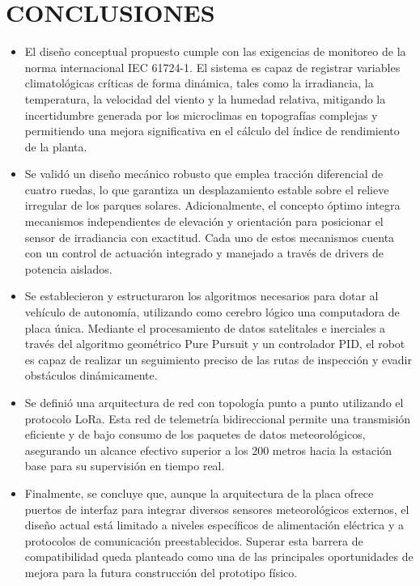 \documentclass[../General.tex]{subfiles}
\begin{document}
\renewcommand{\baselinestretch}{1.5}
\chapter*{\centering \large CONCLUSIONES} %

\begin{itemize}
    \item El diseño conceptual propuesto cumple con las exigencias de monitoreo de la norma internacional IEC 61724-1. El sistema es capaz de registrar variables climatológicas críticas de forma dinámica, tales como la irradiancia, la temperatura, la velocidad del viento y la humedad relativa, mitigando la incertidumbre generada por los microclimas en topografías complejas y permitiendo una mejora significativa en el cálculo del índice de rendimiento de la planta.
    
    \item Se validó un diseño mecánico robusto que emplea tracción diferencial de cuatro ruedas, lo que garantiza un desplazamiento estable sobre el relieve irregular de los parques solares. Adicionalmente, el concepto óptimo integra mecanismos independientes de elevación y orientación para posicionar el sensor de irradiancia con exactitud. Cada uno de estos mecanismos cuenta con un control de actuación integrado y manejado a través de drivers de potencia aislados.
    
    \item Se establecieron y estructuraron los algoritmos necesarios para dotar al vehículo de autonomía, utilizando como cerebro lógico una computadora de placa única. Mediante el procesamiento de datos satelitales e inerciales a través del algoritmo geométrico Pure Pursuit y un controlador PID, el robot es capaz de realizar un seguimiento preciso de las rutas de inspección y evadir obstáculos dinámicamente.
    
    \item Se definió una arquitectura de red con topología punto a punto utilizando el protocolo LoRa. Esta red de telemetría bidireccional permite una transmisión eficiente y de bajo consumo de los paquetes de datos meteorológicos, asegurando un alcance efectivo superior a los 200 metros hacia la estación base para su supervisión en tiempo real.
    
    \item Finalmente, se concluye que, aunque la arquitectura de la placa ofrece puertos de interfaz para integrar diversos sensores meteorológicos externos, el diseño actual está limitado a niveles específicos de alimentación eléctrica y a protocolos de comunicación preestablecidos. Superar esta barrera de compatibilidad queda planteado como una de las principales oportunidades de mejora para la futura construcción del prototipo físico.
\end{itemize}
\end{document}
